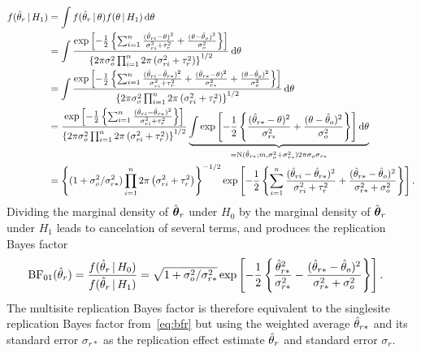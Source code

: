 \documentclass[a4paper, 11pt]{article}
\begin{document}
\begin{align*}
        f(\hat{\theta}_{r} \,\vert\, H_{1})
        &= \int f(\hat{\theta}_{r} \,\vert\, \theta) f(\theta \,\vert\, H_{1})
                        \, \text{d}\theta \\
              &= \int \frac{\exp\left[-\frac{1}{2} \left\{\sum_{i=1}^{n} \frac{(\hat{\theta}_{ri} - \theta)^{2}}{\sigma^{2}_{ri} + \tau^{2}_{r}} +
                  \frac{(\theta - \hat{\theta}_{o})^{2}}{\sigma^{2}_{o}}\right\} \right]}{
                                    \left\{2\pi \sigma^{2}_{o} \prod_{i = 1}^{n} 2\pi \left(\sigma^{2}_{ri} + \tau^{2}_{r}\right)\right\}^{1/2}}
    \, \text{d}\theta \\
  &= \int \frac{
    \exp\left[-\frac{1}{2} \left\{\sum_{i=1}^{n} \frac{(\hat{\theta}_{ri} - \hat{\theta}_{r*})^{2}}{\sigma^{2}_{ri} + \tau^{2}_{r}} +  \frac{(\hat{\theta}_{r*} - \theta)^{2}}{\sigma^{2}_{r*}} +
    \frac{(\theta - \hat{\theta}_{o})^{2}}{\sigma^{2}_{o}}\right\} \right]}{
    \left\{2\pi \sigma^{2}_{o} \prod_{i = 1}^{n} 2\pi \left(\sigma^{2}_{ri} + \tau^{2}_{r}\right)\right\}^{1/2}}
    \, \text{d}\theta \\
  &= \frac{\exp\left[-\frac{1}{2} \left\{\sum_{i=1}^{n} \frac{(\hat{\theta}_{ri} - \hat{\theta}_{r*})^{2}}{\sigma^{2}_{ri} + \tau^{2}_{r}}\right\} \right]}{\left\{2\pi \sigma^{2}_{o} \prod_{i = 1}^{n} 2\pi \left(\sigma^{2}_{ri} + \tau^{2}_{r}\right)\right\}^{1/2}}
    \underbrace{\int \exp\left[-\frac{1}{2} \left\{\frac{(\hat{\theta}_{r*} - \theta)^{2}}{\sigma^{2}_{r*}} +
    \frac{(\theta - \hat{\theta}_{o})^{2}}{\sigma^{2}_{o}}\right\} \right] \text{d}\theta}_{= \operatorname{N}(\hat{\theta}_{r*}; m, \sigma^{2}_{o} + \sigma^{2}_{r*}) 2\pi \sigma_{o} \sigma_{r*}} \\
  &= \left\{(1 + \sigma^{2}_{o}/\sigma^{2}_{r*}) \prod_{i = 1}^{n} 2\pi \left(\sigma^{2}_{ri} + \tau^{2}_{r}\right)\right\}^{-1/2} \exp\left[-\frac{1}{2}\left\{
    \sum_{i=1}^{n} \frac{(\hat{\theta}_{ri} - \hat{\theta}_{r*})^{2}}{\sigma^{2}_{ri} + \tau^{2}_{r}} + \frac{(\hat{\theta}_{r*} - \hat{\theta}_{o})^{2}}{\sigma^{2}_{r*} + \sigma^{2}_{o}}\right\}\right].
\end{align*}
Dividing the marginal density of $\hat{\boldsymbol{\theta}}_{r}$ under $H_{0}$ by the marginal
density of $\hat{\boldsymbol{\theta}}_{r}$ under $H_{1}$ leads to cancelation of several terms, and
produces the replication Bayes factor
\begin{align*}
  \operatorname{BF}_{01}(\hat{\theta}_{r})
  &= \frac{f(\hat{\theta}_{r} \,\vert\, H_{0})}{f(\hat{\theta}_{r} \,\vert\, H_{1})}
    = \sqrt{1 + \sigma^{2}_{o}/\sigma^{2}_{r*}}  \exp\left[-\frac{1}{2}\left\{
    \frac{\hat{\theta}_{r*}^{2}}{\sigma^{2}_{r*}} -
    \frac{(\hat{\theta}_{r*} - \hat{\theta}_{o})^{2}}{\sigma^{2}_{r*} + \sigma^{2}_{o}}\right\}\right].
\end{align*}
The multisite replication Bayes factor is therefore equivalent to the singlesite
replication Bayes factor from~\eqref{eq:bfr} but using the weighted average
$\hat{\theta}_{r*}$ and its standard error $\sigma_{r*}$ as the replication effect
estimate $\hat{\theta}_{r}$ and standard error $\sigma_{r}$.
\end{document}
